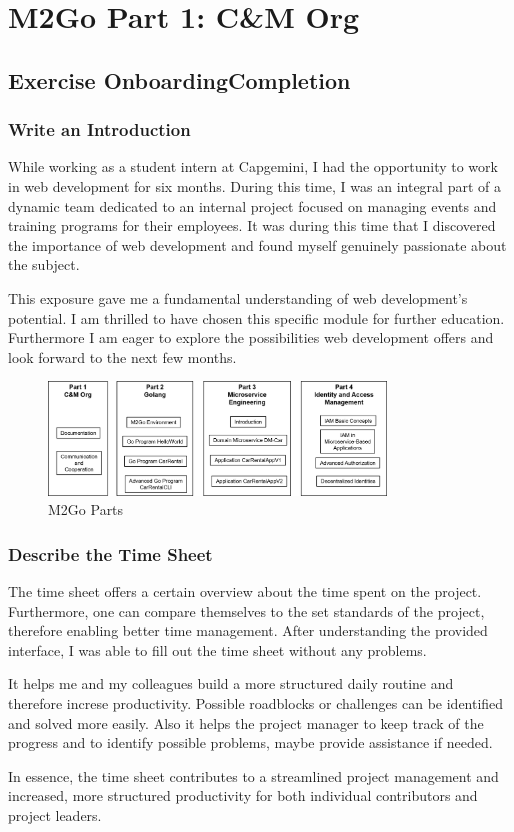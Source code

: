 \chapter{M2Go Part 1: C\&M Org}
\label{cha:cm_org}

\section{Exercise OnboardingCompletion}

\subsection{Write an Introduction}
While working as a student intern at Capgemini, I had the opportunity to work in web development for six months.
During this time, I was an integral part of a dynamic team dedicated to an internal project focused on managing events and training programs for their employees.
It was during this time that I discovered the importance of web development and found myself genuinely passionate about the subject.

This exposure gave me a fundamental understanding of web development's potential.
I am thrilled to have chosen this specific module for further education. 
Furthermore I am eager to explore the possibilities web development offers and look forward to the next few months.

\begin{figure}[H]
	\centering
	\includegraphics[width=0.8\textwidth]{figures/m2go_parts.png}
	\caption{M2Go Parts}
	\label{fig:m2go_parts_again}
\end{figure}

\subsection{Describe the Time Sheet}
The time sheet offers a certain overview about the time spent on the project. Furthermore, one can compare themselves to the set standards of the project, therefore enabling better time management.
After understanding the provided interface, I was able to fill out the time sheet without any problems.

It helps me and my colleagues build a more structured daily routine and therefore increse productivity. Possible roadblocks or challenges can be identified and solved more easily.
Also it helps the project manager to keep track of the progress and to identify possible problems, maybe provide assistance if needed.

In essence, the time sheet contributes to a streamlined project management and increased, more structured productivity for both individual contributors and project leaders.